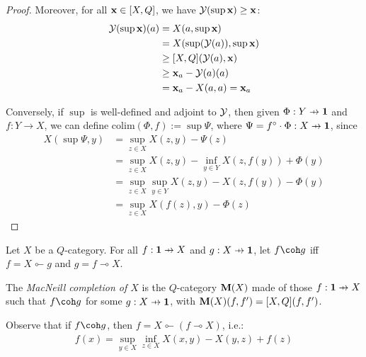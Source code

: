 \begin{proof}
Moreover, for all $\mathbf{x}\in [X,Q]$, we have $\mathcal{Y}(\sup \mathbf{x})\geq \mathbf{x}$:  
\begin{align*}
\mathcal{Y}(\sup \mathbf{x})(a) &= X(a,\sup \mathbf{x})\\
&= X(  \sup(\mathcal{Y}(a)),\sup \mathbf{x}) \\
& \geq [X,Q]( \mathcal{Y}(a), \mathbf{x})\\
&\geq\mathbf{x}_{a}-\mathcal{Y}(a)(a) \\
&=
 \mathbf{x}_{a}-X(a,a)  = \mathbf{x}_{a}
\end{align*}
%
%
% 

Conversely, if $\sup$ is well-defined and adjoint to $\mathcal{Y}$, then 
given $\Phi: Y\pfun \B 1$ and $f:Y\to X$, 
we can define
$\mathrm{colim}(\Phi, f):= \sup\Psi$, where $\Psi=
 f^{\circ}\cdot \Phi: X\pfun \B 1$, since 
\begin{align*}
X(\sup \Psi, y)&=
\sup_{z\in X}X(z,y)-\Psi(z) \\
&=\sup_{z\in X}X(z,y)- \inf_{y\in Y}X(z,f(y))  +\Phi(y)\\
& = \sup_{z\in X}\sup_{y\in Y}X(z,y)-X(z,f(y))  -\Phi(y)\\
&=
\sup_{z\in X} X(f(z),y) - \Phi(z)
\end{align*}
\end{proof}



\begin{definition}
Let $X$ be a $Q$-category. For all $f: \B 1\pfun X$ and $g:X\pfun \B 1$, let $f \coh g$ iff 
$f  = X\multimapinv g $ and 
$g = f\multimap X$. 


The \emph{MacNeill completion of $X$} is the $Q$-category $\mathbf{M}(X)$ made of those 
$f:\B 1\pfun X$ such that $f\coh g$ for some $g:X\pfun \B 1$, with
$\mathbf{M}(X)(f,f')=[X,Q](f,f')$. 
\end{definition}


Observe that if $f\coh g$, then $f= X\multimapinv (f\multimap X)$, i.e.:
\begin{align}
f(x)=  \sup_{y\in X}\inf_{z\in X}X(x,y)-X(y,z) +f(z)       
\tag{COH}
\end{align}





